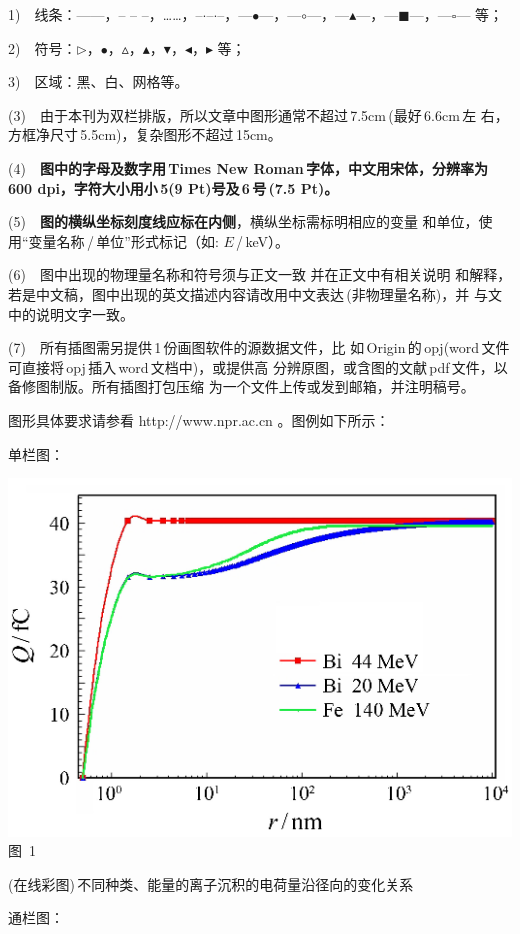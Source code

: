 \documentclass[a4paper,10.0pt,twoside]{npr}
\begin{document}
\begin{multicols}{2}
1)~~线条：------，-- -- --，……，--$\cdot$--$\cdot$--，---$\bullet$---，---$\circ$---，---$\blacktriangle$---，---$
\blacksquare$---，---$\square$--- 等；

2)~~符号：$\triangleright$，$\bullet$，$\vartriangle$，$\blacktriangle$，$ \blacktriangledown$，$\blacktriangleleft$，$\blacktriangleright $ 等；

3)~~区域：黑、白、网格等。

(3)~~由于本刊为双栏排版，所以文章中图形通常不超过\,7.5cm\,(最好\,6.6cm\,左
右，方框净尺寸\,5.5cm)，复杂图形不超过\,15cm。

(4)~~\textbf{图中的字母及数字用\,Times New Roman\,字体，中文用宋体，分辨率为\,600 dpi，字符大小用小\,5(9 Pt)号及\,6\,号\,(7.5 Pt)。}


(5)~~\textbf{图的横纵坐标刻度线应标在内侧}，横纵坐标需标明相应的变量
和单位，使用“变量名称\,/\,单位”形式标记（如: $E$\,/\,keV）。


(6)~~{图中出现的物理量名称和符号须与正文一致
并在正文中有相关说明
和解释，若是中文稿，图中出现的英文描述内容请改用中文表达\,(非物理量名称)，并
与文中的说明文字一致。}


(7)~~{所有插图需另提供\,1\,份画图软件的源数据文件，比
如\,Origin\,的\,opj}(word\,文件可直接将\,opj\,插入\,word\,文档中)，{或提供高
分辨原图，或含图的文献\,pdf\,文件，以备修图制版。所有插图打包压缩
为一个文件上传或发到邮箱，并注明稿号。}


图形具体要求请参看 http://www.npr.ac.cn 。图例如下所示：

单栏图：
\begin{center}
\includegraphics{tu1.eps}\\
\xiaowu\song 图~1\begin{minipage}[t]{75mm} \quad (在线彩图)\,不同种类、能量的离子沉积的电荷量沿径向的变化关系\\[-1mm]\wuhao
\end{minipage}
\end{center}
通栏图：
\end{multicols}
\end{document}

